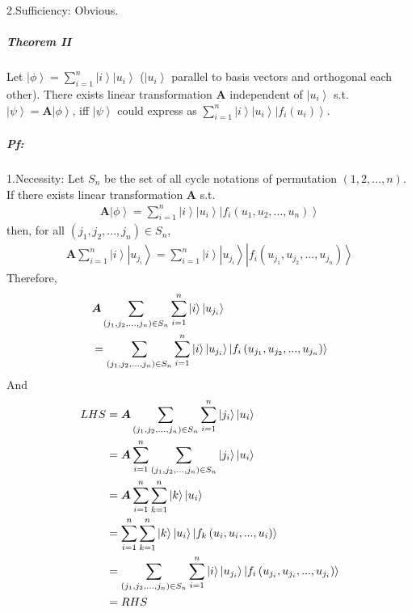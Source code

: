 \documentclass[%
 reprint,
 amsmath,amssymb,
pra,
]{revtex4-1}
\begin{document}
2.Sufficiency: Obvious.

\subparagraph{Theorem II} Let $\left|\phi\right\rangle = \sum_{i=1}^n \left|i\right\rangle\left|u_i\right\rangle$ ($\left|u_i\right\rangle$ parallel to basis vectors and orthogonal each other). There exists 
linear transformation $\bm{A}$ independent of $\left|u_{i}\right\rangle$ s.t. $\left|\psi\right\rangle = \bm{A}\left|\phi\right\rangle$, iff $\left|\psi\right\rangle$ could express as $\sum_{i=1}^n \left|i\right\rangle\left|u_i\right\rangle\left|f_{i}\left(u_i\right)\right\rangle$.

\subparagraph{Pf:} 1.Necessity: Let $S_n$ be the set of all cycle notations of permutation $\left(1, 2, ..., n\right)$. If there exists linear transformation $\bm{A}$ s.t. 
\begin{align*}
	\bm{A}\left|\phi\right\rangle = \sum_{i=1}^n \left|i\right\rangle\left|u_i\right\rangle\left|f_{i}\left(u_1, u_2, ..., u_n\right)\right\rangle
\end{align*}
then, for all $\left(j_1, j_2, ..., j_n\right)\in S_n$, 
\begin{align*}
	\bm{A}\sum_{i=1}^n \left|i\right\rangle\left|u_{j_i}\right\rangle = \sum_{i=1}^n \left|i\right\rangle\left|u_{j_i}\right\rangle\left|f_{i}\left(u_{j_1}, u_{j_2}, ..., u_{j_n}\right)\right\rangle
\end{align*}
Therefore,  
\begin{align*}
	&\bm{A}\sum_{\left(j_1, j_2, ..., j_n\right)\in S_n}\sum_{i=1}^n \left|i\right\rangle\left|u_{j_i}\right\rangle \notag\\
	&=\sum_{\left(j_1, j_2, ..., j_n\right)\in S_n}\sum_{i=1}^n\left|i\right\rangle\left|u_{j_i}\right\rangle\left|f_{i}\left(u_{j_1}, u_{j_2}, ..., u_{j_n}\right)\right\rangle
\end{align*}
And
\begin{align*}
	LHS &= \bm{A}\sum_{\left(j_1, j_2, ..., j_n\right)\in S_n}\sum_{i=1}^n \left|j_i\right\rangle\left|u_i\right\rangle\notag\\
	&= \bm{A}\sum_{i=1}^n\sum_{\left(j_1, j_2, ..., j_n\right)\in S_n}\left|j_i\right\rangle\left|u_i\right\rangle\notag\\
	&= \bm{A}\sum_{i=1}^n\sum_{k=1}^n\left|k\right\rangle\left|u_i\right\rangle \notag\\
	&= \sum_{i=1}^n\sum_{k=1}^n\left|k\right\rangle\left|u_i\right\rangle\left|f_{k}\left(u_i, u_i, ..., u_i\right)\right\rangle\notag\\
	&= \sum_{\left(j_1, j_2, ..., j_n\right)\in S_n}\sum_{i=1}^n\left|i\right\rangle\left|u_{j_i}\right\rangle\left|f_{i}\left(u_{j_i}, u_{j_i}, ..., u_{j_i}\right)\right\rangle\notag\\
	&= RHS
\end{align*}
\end{document}
